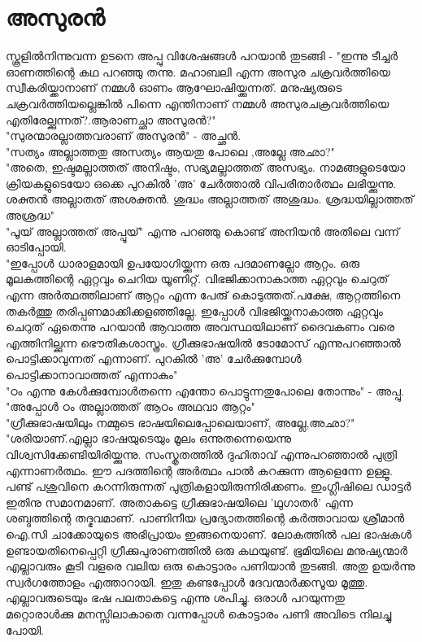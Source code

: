 \chapter{അസുരൻ}
സ്കൂളിൽനിന്നുവന്ന ഉടനെ അപ്പു വിശേഷങ്ങൾ പറയാൻ തുടങ്ങി - "ഇന്നു ടീച്ചർ ഓണത്തിന്റെ കഥ പറഞ്ഞു തന്നു. മഹാബലി എന്ന അസുര ചക്രവർത്തിയെ സ്വീകരിയ്ക്കാനാണ്‌ നമ്മൾ ഓണം ആഘോഷിയ്ക്കുന്നത്. മനുഷ്യരുടെ ചക്രവർത്തിയല്ലെങ്കിൽ പിന്നെ എന്തിനാണ്‌ നമ്മൾ അസുരചക്രവർത്തിയെ എതിരേല്ക്കുന്നത്?.ആരാണച്ഛാ അസുരൻ?"\\
"സുരന്മാരല്ലാത്തവരാണ്‌ അസുരൻ" - അച്ഛൻ.\\
"സത്യം അല്ലാത്തതു അസത്യം ആയതു പോലെ ,അല്ലേ അഛാ?"\\
"അതെ, ഇഷ്ടമല്ലാത്തത് അനിഷ്ടം, സഭ്യമല്ലാത്തത് അസഭ്യം. നാമങ്ങളുടെയോ ക്രിയകളുടെയോ ഒക്കെ പുറകിൽ 'അ' ചേർത്താൽ വിപരീതാർത്ഥം ലഭിയ്ക്കുന്നു. ശക്തൻ അല്ലാതത് അശക്തൻ. ശുദ്ധം അല്ലാത്തത് അശുദ്ധം. ശ്രദ്ധയില്ലാത്തത് അശ്രദ്ധ"\\
"പൂയ് അല്ലാത്തത് അപ്പൂയ്" എന്നു പറഞ്ഞു കൊണ്ട് അനിയൻ അതിലെ വന്ന് ഓടിപ്പോയി.\\
"ഇപ്പോൾ ധാരാളമായി ഉപയോഗിയ്ക്കുന്ന ഒരു പദമാണല്ലോ ആറ്റം. ഒരു മൂലകത്തിന്റെ ഏറ്റവും ചെറിയ യൂണിറ്റ്. വിഭജിക്കാനാകാത്ത ഏറ്റവും ചെറുത് എന്ന അർത്ഥത്തിലാണ്‌ ആറ്റം എന്ന പേരു് കൊടുത്തത്.പക്ഷേ, ആറ്റത്തിനെ തകർത്തു തരിപ്പണമാക്കിക്കളഞ്ഞില്ലേ. ഇപ്പോൾ വിഭജിയ്ക്കനാകാത്ത ഏറ്റവും ചെറുത് ഏതെന്നു പറയാൻ ആവാത്ത അവസ്ഥയിലാണ്‌ ദൈവകണം വരെ എത്തിനില്ക്കുന്ന ഭൌതികശാസ്ത്രം. ഗ്രീക്കുഭാഷയിൽ ടോമോസ് എന്നുപറഞ്ഞാൽ പൊട്ടിക്കാവുന്നത് എന്നാണ്‌. പുറകിൽ 'അ' ചേർക്കുമ്പോൾ പൊട്ടിക്കാനാവാത്തത് എന്നാകും"\\
"ഠം എന്നു കേൾക്കുമ്പോൾതന്നെ എന്തോ പൊട്ടുന്നതുപോലെ തോന്നും" - അപ്പു.\\
"അപ്പോൾ ഠം അല്ലാത്തത് ആഠം അഥവാ ആറ്റം"\\
"ഗ്രീക്കുഭാഷയിലും നമ്മുടെ ഭാഷയിലെപ്പോലെയാണ്‌, അല്ലേ,അഛാ?"\\
"ശരിയാണ്‌.എല്ലാ ഭാഷയുടെയും മൂലം ഒന്നുതന്നെയെന്നു വിശ്വസിക്കേണ്ടിയിരിയ്ക്കുന്നു. സംസ്കൃതത്തിൽ ദുഹിതാവ് എന്നുപറഞ്ഞാൽ പുത്രി എന്നാണർത്ഥം. ഈ പദത്തിന്റെ അർത്ഥം പാൽ കറക്കുന്ന ആളെന്നേ ഉള്ളൂ. പണ്ട് പശുവിനെ കറന്നിരുന്നത് പുത്രികളായിരുന്നിരിക്കണം. ഇംഗ്ലീഷിലെ ഡാട്ടർ ഇതിനു സമാനമാണ്‌. അതാകട്ടെ ഗ്രീക്കുഭാഷയിലെ 'ഥുഗാതർ' എന്ന ശബ്ദത്തിന്റെ തദ്ഭവമാണ്‌. പാണിനീയ പ്രദ്യോതത്തിന്റെ കർത്താവായ ശ്രീമാൻ ഐ.സി ചാക്കോയുടെ അഭിപ്രായം ഇങ്ങനെയാണ്‌.
ലോകത്തിൽ പല ഭാഷകൾ ഉണ്ടായതിനെപ്പെറ്റി ഗ്രീക്കുപുരാണത്തിൽ ഒരു കഥയുണ്ട്. ഭൂമിയിലെ മനുഷ്യന്മാർ എല്ലാവരും കൂടി വളരെ വലിയ ഒരു കൊട്ടാരം പണിയാൻ തുടങ്ങി. അതു ഉയർന്നു സ്വർഗത്തോളം എത്താറായി. ഇതു കണ്ടപ്പോൾ ദേവന്മാർക്കസൂയ മൂത്തു. എല്ലാവരുടെയും ഭഷ പലതാകട്ടെ എന്നു ശപിച്ചു. ഒരാൾ പറയുന്നതു മറ്റൊരാൾക്കു മനസ്സിലാകാതെ വന്നപ്പോൾ കൊട്ടാരം പണി അവിടെ നിലച്ചു പോയി.\\
